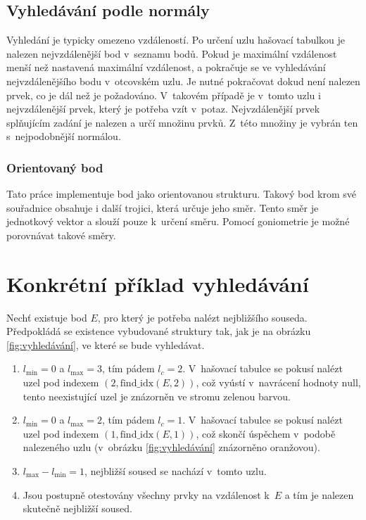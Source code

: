 \subsection*{Vyhledávání podle normály}

Vyhledání je typicky omezeno vzdáleností. Po určení uzlu hašovací tabulkou je nalezen nejvzdálenější bod v~seznamu bodů. Pokud je maximální vzdálenost menší než nastavená maximální vzdálenost, a pokračuje se ve vyhledávání nejvzdálenějšího bodu v~otcovském uzlu. Je nutné pokračovat dokud není nalezen prvek, co je dál než je požadováno. V~takovém případě je v~tomto uzlu i nejvzdálenější prvek, který je potřeba vzít v~potaz. Nejvzdálenější prvek splňujícím zadání je nalezen a určí množinu prvků. Z~této množiny je vybrán ten s~nejpodobnější normálou. 

\subsubsection{Orientovaný bod}
Tato práce implementuje bod jako orientovanou strukturu. Takový bod krom své souřadnice obsahuje i další trojici, která určuje jeho směr. Tento směr je jednotkový vektor a slouží pouze k~určení směru. Pomocí goniometrie je možné porovnávat takové směry.


\section{Konkrétní příklad vyhledávání}
Nechť existuje bod \( E \), pro který je potřeba nalézt nejbližšího souseda. Předpokládá se existence vybudované struktury tak, jak je na obrázku \ref{fig:vyhledávání}, ve které se bude vyhledávat.

\begin{enumerate}
    \item \( l_{\text{min}} = 0 \) a \( l_{\text{max}} = 3 \), tím pádem \( l_c = 2 \). V~hašovací tabulce se pokusí nalézt uzel pod indexem \( (2, \text{find\_idx}(E,2)) \), což vyústí v~navrácení hodnoty \( \text{null} \), tento neexistující uzel je znázorněn ve stromu zelenou barvou.
    \item \( l_{\text{min}} = 0 \) a \( l_{\text{max}} = 2 \), tím pádem \( l_c = 1 \). V~hašovací tabulce se pokusí nalézt uzel pod indexem \( (1, \text{find\_idx}(E,1)) \), což skončí úspěchem v~podobě nalezeného uzlu (v~obrázku \ref{fig:vyhledávání} znázorněno oranžovou).
    \item \( l_{\text{max}} - l_{\text{min}} = 1 \), nejbližší soused se nachází v~tomto uzlu.
    \item Jsou postupně otestovány všechny prvky na vzdálenost k~\( E \) a tím je nalezen skutečně nejbližší soused.
\end{enumerate}

